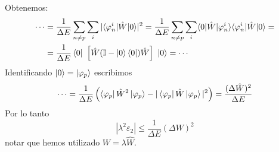   Obtenemos:
  \begin{equation}
    \begin{split}
      \cdots &=\frac{1}{\Delta E} \sum_{n \neq p} \sum_{i}
      |\langle\varphi_n^i|\hat{W}|0\rangle|^2 = \frac{1}{\Delta E} \sum_{n \neq p} \sum_{i}
      \langle 0|\hat{W}|\varphi_n^i\rangle \langle\varphi_n^i|\hat{W}|0\rangle  = \\ &=
      \frac{1}{\Delta E} \bra{0} \ \left[ \hat{W}
        (\mathbb{I}-\ket{0}\bra{0})\hat{W} \right]\  \ket{0} = \cdots
    \end{split}
  \end{equation}
  Identificando $\ket{0} = \ket{\varphi_p}$ escribimos
  \begin{equation}
    \cdots = \frac{1}{\Delta E} \left( \bra{\varphi_p}\hat{W}^2\ket{\varphi_p} -
      |\bra{\varphi_p}\hat{W}\ket{\varphi_p}|^2 \right) = \frac{(\Delta
      \hat{W})^2}{\Delta E}
  \end{equation}
  Por lo tanto
  \begin{equation}
    \boxed{
    |\lambda^2 \varepsilon_2| \leq \frac{1}{\Delta E}(\Delta W)^2}
  \end{equation}
  notar que hemos utilizado $W=\lambda\hat{W}$.


